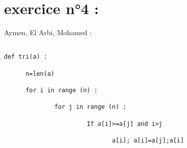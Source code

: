 \documentclass{article}
\begin{document}
\section{exercice n°4 :}
	\begin{center}
    		Aymen, El Arbi, Mohamed :
	\end{center}
	\begin{verbatim}
	
def tri(a) :

      n=len(a)

      for i in range (n) :

              for j in range (n) :

                       If a[i]>=a[j] and i>j

                              a[i]; a[i]=a[j];a[i]
	\end{verbatim}
\end{document}
